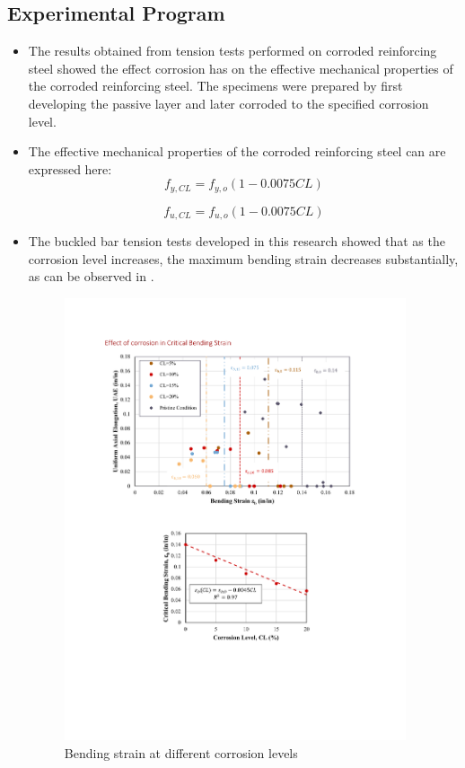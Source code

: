 \subsection{Experimental Program}
\begin{itemize}
    \item The results obtained from tension tests performed on corroded reinforcing steel showed the effect corrosion has on the effective mechanical properties of the corroded reinforcing steel. The specimens were prepared by first developing the passive layer and later corroded to the specified corrosion level.
    \item The effective mechanical properties of the corroded reinforcing steel can are expressed here:
    \begin{equation}
        f_{y,CL} = f_{y,o}(1-0.0075CL)
        \label{eq.Calderon_Fy_vs_CL_ch7}
    \end{equation}
    
    \begin{equation}
        f_{u,CL} = f_{u,o}(1-0.0075CL)
        \label{eq.Calderon_Fu_vs_CL_ch7}
    \end{equation}

    \item The buckled bar tension tests developed in this research showed that as the corrosion level increases, the maximum bending strain decreases substantially, as can be observed in .
    
    \begin{figure}[htbp]
	    \centering
	    \includegraphics[width=0.95\textwidth]{VAC Thesis 2.0/Chapter-4/figs/BBT_results_.pdf}
	    \caption{Bending strain at different corrosion levels}
	    \label{fig:BBT_strains_ch7}
    \end{figure}
    

\end{itemize}
